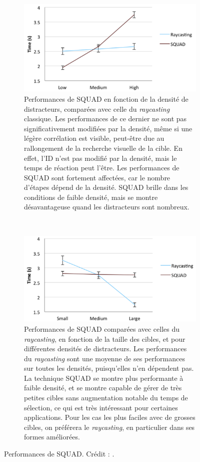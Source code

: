 	\begin{figure}[!htb]
		\begin{subfigure}[t]{0.49\textwidth}
			\centering
			\includegraphics[width=\textwidth]{figures/ch2/squadDensity}
			\caption{Performances de SQUAD en fonction de la densité de distracteurs, comparées avec celle du \emph{raycasting} classique. Les performances de ce dernier ne sont pas significativement modifiées par la densité, même si une légère corrélation est visible, peut-être due au rallongement de la recherche visuelle de la cible. En effet, l'ID n'est pas modifié par la densité, mais le temps de réaction peut l'être. Les performances de SQUAD sont fortement affectées, car le nombre d'étapes dépend de la densité. SQUAD brille dans les conditions de faible densité, mais se montre désavantageuse quand les distracteurs sont nombreux.}
			\label{fig:squadDensity}
		\end{subfigure}
		~
		\begin{subfigure}[t]{0.49\textwidth}
			\centering
			\includegraphics[width=\textwidth]{figures/ch2/squadSize}
			\caption{Performances de SQUAD comparées avec celles du \emph{raycasting}, en fonction de la taille des cibles, et pour différentes densités de distracteurs. Les performances du \emph{raycasting} sont une moyenne de ses performances sur toutes les densités, puisqu'elles n'en dépendent pas. La technique SQUAD se montre plus performante à faible densité, et se montre capable de gérer de très petites cibles sans augmentation notable du temps de sélection, ce qui est très intéressant pour certaines applications. Pour les cas les plus faciles avec de grosses cibles, on préférera le \emph{raycasting}, en particulier dans ses formes améliorées.}
			\label{fig:squadSize}
		\end{subfigure}
		\caption[Performances de SQUAD]{Performances de SQUAD. Crédit : \cite{kopper2011rapid}.}
		\label{fig:squadPerf}
	\end{figure}
	
